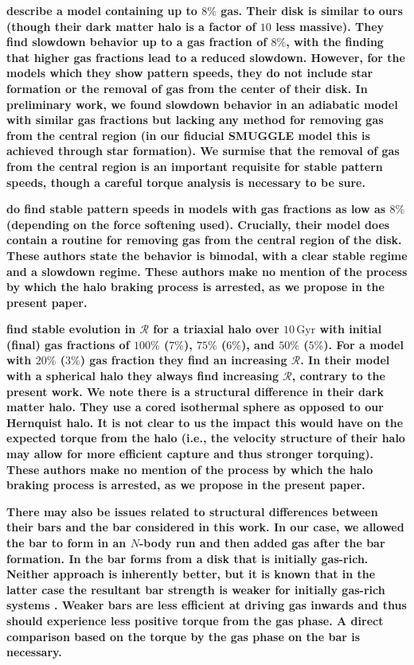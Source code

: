\documentclass[twocolumn,linenumbers,trackchanges]{aastex631}
\newcommand{\Rot}{\ensuremath{\mathcal{R}}}
\begin{document}
{\bf \citet{2007ApJ...666..189B} describe a model containing up to $8\%$ gas.
Their disk is similar to ours (though their dark matter halo is a factor of $10$
less massive). They find slowdown behavior up to a gas fraction of $8\%$, with
the finding that higher gas fractions lead to a reduced slowdown. However, for
the models which they show pattern speeds, they do not include star formation or
the removal of gas from the center of their disk. In preliminary work, we found
slowdown behavior in an adiabatic model with similar gas fractions but lacking
any method for removing gas from the central region (in our fiducial SMUGGLE
model this is achieved through star formation). We surmise that the removal of
gas from the central region is an important requisite for stable pattern speeds,
though a careful torque analysis is necessary to be sure.}

{\bf \citet{2010ApJ...719.1470V} do find stable pattern speeds in models with
gas fractions as low as $8\%$ (depending on the force softening used).
Crucially, their model does contain a routine for removing gas from the central
region of the disk. These authors state the behavior is bimodal, with a clear
stable regime and a slowdown regime. These authors make no mention of the
process by which the halo braking process is arrested, as we propose in the
present paper.}

{\bf \citet{2013MNRAS.429.1949A, 2014MNRAS.438L..81A} find stable evolution in
\Rot{} for a triaxial halo over $10\,\textrm{Gyr}$ with initial (final) gas
fractions of $100\%$ ($7\%$), $75\%$ ($6\%$), and $50\%$ ($5\%$). For a model
with $20\%$ ($3\%$) gas fraction they find an increasing \Rot{}. In their model
with a spherical halo they always find increasing \Rot{}, contrary to the
present work. We note there is a structural difference in their dark matter
halo. They use a cored isothermal sphere as opposed to our Hernquist halo. It is
not clear to us the impact this would have on the expected torque from the halo
(i.e., the velocity structure of their halo may allow for more efficient capture
and thus stronger torquing). These authors make no mention of the process by
which the halo braking process is arrested, as we propose in the present paper.}

{\bf There may also be issues related to structural differences between their
bars and the bar considered in this work. In our case, we allowed the bar to
form in an $N$-body run and then added gas after the bar formation. In
\citet{2013MNRAS.429.1949A, 2014MNRAS.438L..81A} the bar forms from a disk that
is initially gas-rich. Neither approach is inherently better, but it is known
that in the latter case the resultant bar strength is weaker for initially
gas-rich systems \citep[e.g.,][]{2013MNRAS.429.1949A}. Weaker bars are less
efficient at driving gas inwards \citep{2004ApJ...600..595R} and thus should
experience less positive torque from the gas phase. A direct comparison based on
the torque by the gas phase on the bar is necessary.}
\end{document}
